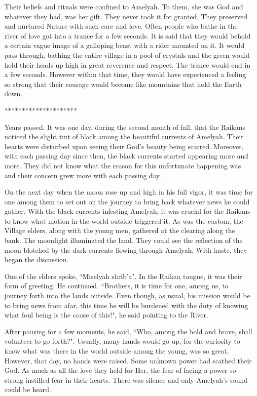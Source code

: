 \documentclass[twoside,11pt,titlepage]{article}
\begin{document}
Their beliefs and rituals were confined to Amelyah. To them, she was God and whatever they had, was her gift. They never took it for granted. They preserved and nurtured Nature with such care and love. Often people who bathe in the river of love got into a trance for a few seconds. It is said that they would behold a certain vague image of a galloping beast with a rider mounted on it. It would pass through, bathing the entire village in a pool of crystals and the green would hold their heads up high in great reverence and respect. The trance would end in a few seconds. However within that time, they would have experienced a feeling so strong that their courage would become like mountains that hold the Earth down.

\bigskip
\begin{center}
*********************
\end{center}

Years passed. It was one day, during the second month of fall, that the Raikans noticed the slight tint of black among the beautiful currents of Amelyah. Their hearts were disturbed upon seeing their God's beauty being scarred. Moreover, with each passing day since then, the black currents started appearing more and more. They did not know what the reason for this unfortunate happening was and their concern grew more with each passing day.

On the next day when the moon rose up and high in his full vigor, it was time for one among them to set out on the journey to bring back whatever news he could gather. With the black currents infesting Amelyah, it was crucial for the Raikans to know what motion in the world outside triggered it. As was the custom, the Village elders, along with the young men, gathered at the clearing along the bank. The moonlight illuminated the land. They could see the reflection of the moon blotched by the dark currents flowing through Amelyah. With haste, they began the discussion.

One of the elders spoke, ``Miselyah shrib'a". In the Raikan tongue, it was their form of greeting. He continued. ``Brothers, it is time for one, among us, to journey forth into the lands outside. Even though, as usual, his mission would be to bring news from afar, this time he will be burdened with the duty of knowing what foul being is the cause of this!", he said pointing to the River.

After pausing for a few moments, he said, ``Who, among the bold and brave, shall volunteer to go forth?". Usually, many hands would go up, for the curiosity to know what was there in the world outside among the young, was so great. However, that day, no hands were raised. Some unknown power had scathed their God. As much as all the love they held for Her, the fear of facing a power so strong instilled fear in their hearts. There was silence and only Amelyah's sound could be heard.
\end{document}
